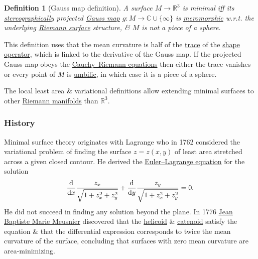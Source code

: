 \documentclass{article}
\newtheorem{definition}{Definition}
\begin{document}
\begin{definition}[Gauss map definition]
	A surface $M\to\mathbb{R}^3$ is minimal iff its \href{https://en.wikipedia.org/wiki/Stereographic_projection}{stereographically} projected \href{https://en.wikipedia.org/wiki/Gauss_map}{Gauss map} $g:M\to\mathbb{C}\cup\{\infty\}$ is \href{https://en.wikipedia.org/wiki/Meromorphic}{meromorphic} w.r.t. the underlying \href{https://en.wikipedia.org/wiki/Riemann_surface}{Riemann surface} structure, \& $M$ is not a piece of a sphere.
\end{definition}
This definition uses that the mean curvature is half of the \href{https://en.wikipedia.org/wiki/Trace_(linear_algebra)}{trace} of the \href{https://en.wikipedia.org/wiki/Shape_operator#Shape_operator}{shape operator}, which is linked to the derivative of the Gauss map. If the projected Gauss map obeys the \href{https://en.wikipedia.org/wiki/Cauchy%E2%80%93Riemann_equations}{Cauchy--Riemann equations} then either the trace vanishes or every point of $M$ is \href{https://en.wikipedia.org/wiki/Umbilical_point}{umbilic}, in which case it is a piece of a sphere.

The local least area \& variational definitions allow extending minimal surfaces to other \href{https://en.wikipedia.org/wiki/Riemannian_manifolds}{Riemann manifolds} than $\mathbb{R}^3$.

\subsubsection{History}
Minimal surface theory originates with {\sc Lagrange} who in 1762 considered the variational problem of finding the surface $z = z(x,y)$ of least area stretched across a given closed contour. He derived the \href{https://en.wikipedia.org/wiki/Euler\%E2\%80\%93Lagrange\_equation}{Euler--Lagrange equation} for the solution
\begin{equation}
	\frac{{\rm d}}{{\rm d}x}\frac{z_x}{\sqrt{1 + z_x^2 + z_y^2}} + \frac{{\rm d}}{{\rm d}y}\frac{z_y}{\sqrt{1 + z_x^2 + z_y^2}} = 0.
\end{equation}
He did not succeed in finding any solution beyond the plane. In 1776 \href{https://en.wikipedia.org/wiki/Jean_Baptiste_Marie_Meusnier}{\sc Jean Baptiste Marie Meusnier} discovered that the \href{https://en.wikipedia.org/wiki/Helicoid}{helicoid} \& \href{https://en.wikipedia.org/wiki/Catenoid}{catenoid} satisfy the equation \& that the differential expression corresponds to twice the mean curvature of the surface, concluding that surfaces with zero mean curvature are area-minimizing.
\end{document}
